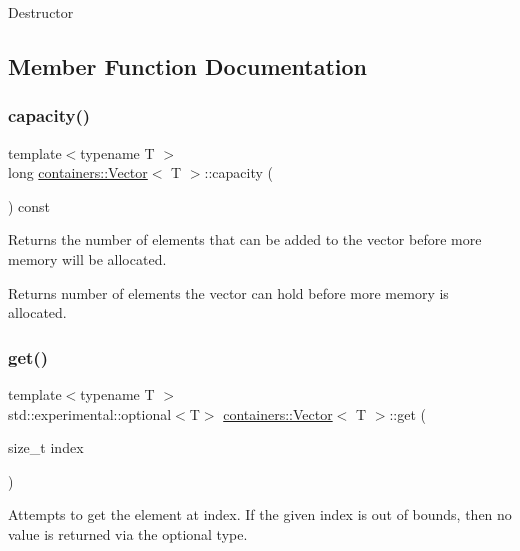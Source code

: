 Destructor 

\subsection{Member Function Documentation}
\mbox{\label{classcontainers_1_1_vector_a11bd73e5c16f891d6828328feacea6b5}} 
\subsubsection{\texorpdfstring{capacity()}{capacity()}}
{\footnotesize\ttfamily template$<$typename T $>$ \\
long \hyperlink{classcontainers_1_1_vector}{containers\+::\+Vector}$<$ T $>$\+::capacity (\begin{DoxyParamCaption}{ }\end{DoxyParamCaption}) const\hspace{0.3cm}{\ttfamily [inline]}}

Returns the number of elements that can be added to the vector before more memory will be allocated.

\begin{DoxyReturn}{Returns}
number of elements the vector can hold before more memory is allocated. 
\end{DoxyReturn}
\mbox{\label{classcontainers_1_1_vector_ab13d1394184f309d92a77e81c099a0be}} 
\subsubsection{\texorpdfstring{get()}{get()}}
{\footnotesize\ttfamily template$<$typename T $>$ \\
std\+::experimental\+::optional$<$T$>$ \hyperlink{classcontainers_1_1_vector}{containers\+::\+Vector}$<$ T $>$\+::get (\begin{DoxyParamCaption}\item[{size\+\_\+t}]{index }\end{DoxyParamCaption})\hspace{0.3cm}{\ttfamily [inline]}}

Attempts to get the element at {\ttfamily index}. If the given index is out of bounds, then no value is returned via the optional type.



